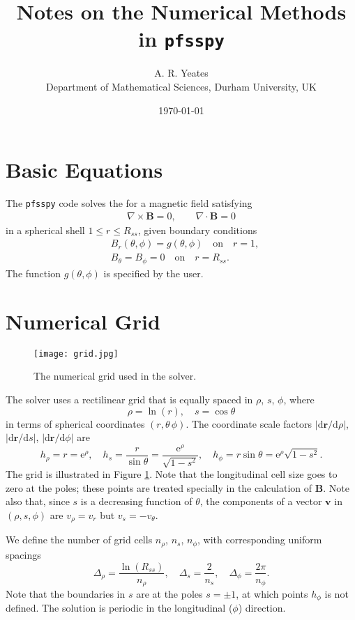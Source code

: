 \documentclass[11pt]{article}
\title{Notes on the Numerical Methods in \texttt{pfsspy}}
\author{A. R. Yeates\\ Department of Mathematical Sciences, Durham University, UK}
\date{\today}
\newcommand{\dr}{\Delta_\rho}
\newcommand{\ds}{\Delta_s}
\newcommand{\dph}{\Delta_\phi}
\newcommand{\nr}{n_\rho}
\newcommand{\ns}{n_s}
\newcommand{\nph}{n_\phi}
\newcommand{\Bb}{\boldsymbol{B}}
\begin{document}
\maketitle

\section{Basic Equations}

The \texttt{pfsspy} code solves the for a magnetic field satisfying
\begin{align}
\nabla\times\Bb=0,\qquad
\nabla\cdot\Bb = 0
\end{align}
in a spherical shell $1 \leq r \leq R_{ss}$, given boundary conditions
\begin{align}
&B_r(\theta,\phi) = g(\theta,\phi) \quad \textrm{on} \quad r=1,\\
&B_\theta=B_\phi=0 \quad \textrm{on} \quad r=R_{ss}. \label{eqn:bc1}
\end{align}
The function $g(\theta,\phi)$ is specified by the user.

\section{Numerical Grid}

\begin{figure}
\texttt{[image: grid.jpg]}
\caption{The numerical grid used in the solver.}
\label{fig:grid}
\end{figure}

The solver uses a rectilinear grid that is equally spaced in $\rho$, $s$, $\phi$, where
\[
\rho = \ln(r), \quad s=\cos\theta
\]
in terms of spherical coordinates $(r,\theta\,\phi)$. The coordinate scale factors $|\mathrm{d}\boldsymbol r/\mathrm{d}\rho|$, $|\mathrm{d}\boldsymbol r/\mathrm{d}s|$, $|\mathrm{d}\boldsymbol r/\mathrm{d}\phi|$ are
\[
h_\rho = r = \mathrm{e}^\rho,\quad h_s = \frac{r}{\sin\theta} = \frac{\mathrm{e}^\rho}{\sqrt{1-s^2}}, \quad h_\phi = r\sin\theta = \mathrm{e}^\rho\sqrt{1-s^2}.
\]
The grid is illustrated in Figure \ref{fig:grid}. Note that the longitudinal cell size goes to zero at the poles; these points are treated specially in the calculation of $\Bb$. Note also that, since $s$ is a decreasing function of $\theta$, the components of a vector $\boldsymbol{v}$ in $(\rho,s,\phi)$ are $v_\rho = v_r$ but $v_s = -v_\theta$.

We define the number of grid cells $\nr$, $\ns$, $\nph$, with corresponding uniform spacings
\[
\dr = \frac{\ln(R_{ss})}{\nr}, \quad \ds = \frac{2}{\ns}, \quad \dph = \frac{2\pi}{\nph}.
\]
Note that the boundaries in $s$ are at the poles $s=\pm1$, at which points $h_\phi$ is not defined. The solution is periodic in the longitudinal ($\phi$) direction.
\end{document}
